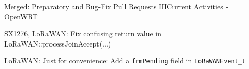 ﻿\begin{frame}[t]{\alert{Merged:} Preparatory and Bug-Fix Pull Requests III}{Current Activities - OpenWRT}
   \begin{description}
         \item [jgromes/RadioLib] SX1276, LoRaWAN: Fix confusing return value in LoRaWAN::processJoinAccept(...)\\\href{https://github.com/jgromes/RadioLib/pull/1262}{}
    \item [jgromes/RadioLib] LoRaWAN: Just for convenience: Add a \texttt{frmPending} field in \texttt{LoRaWANEvent\_t}\\\href{https://github.com/jgromes/RadioLib/pull/1267}{}
  \end{description}
\end{frame}

